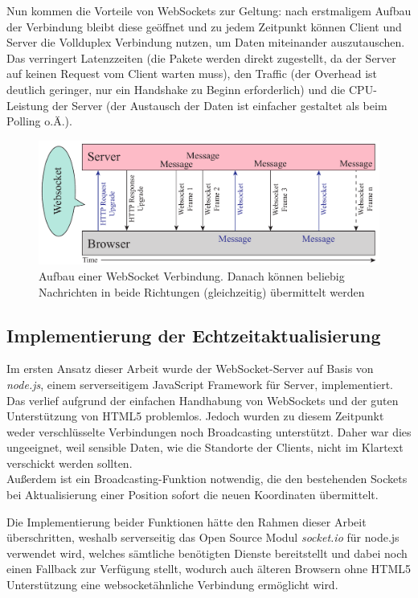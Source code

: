 Nun kommen die Vorteile von WebSockets zur Geltung: nach erstmaligem Aufbau der Verbindung bleibt diese geöffnet und zu jedem Zeitpunkt können Client und Server die Vollduplex Verbindung nutzen, um Daten miteinander auszutauschen. Das verringert Latenzzeiten (die Pakete werden direkt zugestellt, da der Server auf keinen Request vom Client warten muss), den Traffic (der Overhead ist deutlich geringer, nur ein Handshake zu Beginn erforderlich) und die CPU-Leistung der Server (der Austausch der Daten ist einfacher gestaltet als beim Polling o.Ä.).

\begin{figure}[!ht]
	\centering
	\includegraphics[width=15cm]{fig/websockets}
	\caption{Aufbau einer WebSocket Verbindung. Danach können beliebig Nachrichten in beide Richtungen (gleichzeitig) übermittelt werden}
\end{figure}

\subsection{Implementierung der Echtzeitaktualisierung}
Im ersten Ansatz dieser Arbeit wurde der WebSocket-Server auf Basis von \emph{node.js}, einem serverseitigem JavaScript Framework für Server, implementiert. Das verlief aufgrund der einfachen Handhabung von WebSockets und der guten Unterstützung von HTML5 problemlos. Jedoch wurden zu diesem Zeitpunkt weder verschlüsselte Verbindungen noch Broadcasting unterstützt. Daher war dies ungeeignet, weil sensible Daten, wie die Standorte der Clients, nicht im Klartext verschickt werden sollten.\\
Außerdem ist ein Broadcasting-Funktion notwendig, die den bestehenden Sockets bei Aktualisierung einer Position sofort die neuen Koordinaten übermittelt.\par

Die Implementierung beider Funktionen hätte den Rahmen dieser Arbeit überschritten, weshalb serverseitig das Open Source Modul \emph{socket.io} für node.js verwendet wird, welches sämtliche benötigten Dienste bereitstellt und dabei noch einen Fallback zur Verfügung stellt, wodurch auch älteren Browsern ohne HTML5 Unterstützung eine websocketähnliche Verbindung ermöglicht wird.\par

